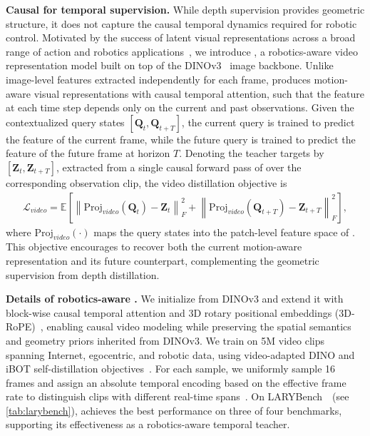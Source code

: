\noindent\textbf{Causal \dinomodel for temporal supervision.}
While depth supervision provides geometric structure, it does not capture the causal temporal dynamics required for robotic control. Motivated by the success of latent visual representations across a broad range of action and robotics applications~\cite{larybench, beingH07, lda1b, dexWorldModel, lawam, wog}, we introduce \dinomodel, a robotics-aware video representation model built on top of the DINOv3~\cite{dinov3} image backbone. Unlike image-level features extracted independently for each frame, \dinomodel produces motion-aware visual representations with causal temporal attention, such that the feature at each time step depends only on the current and past observations.
Given the contextualized query states $[\mathbf{Q}_t, \mathbf{Q}_{t+T}]$, the current query is trained to predict the \dinomodel feature of the current frame, while the future query is trained to predict the feature of the future frame at horizon $T$. Denoting the teacher targets by $[\mathbf{Z}_t, \mathbf{Z}_{t+T}]$, extracted from a single causal forward pass of \dinomodel over the corresponding observation clip, the video distillation objective is
\begin{align}
\mathcal{L}_{video}
=
\mathbb{E}\left[
\left\|\mathrm{Proj}_{video}(\mathbf{Q}_t)-\mathbf{Z}_t\right\|_F^2
+
\left\|\mathrm{Proj}_{video}(\mathbf{Q}_{t+T})-\mathbf{Z}_{t+T}\right\|_F^2
\right],
\label{eq:dino_video}
\end{align}
where $\mathrm{Proj}_{video}(\cdot)$ maps the query states into the patch-level feature space of \dinomodel. This objective encourages \method to recover both the current motion-aware representation and its future counterpart, complementing the geometric supervision from depth distillation.

\noindent\textbf{Details of robotics-aware \dinomodel.}
We initialize \dinomodel from DINOv3 and extend it with block-wise causal temporal attention and 3D rotary positional embeddings (3D-RoPE)~\cite{videorope}, enabling causal video modeling while preserving the spatial semantics and geometry priors inherited from DINOv3. 
We train \dinomodel on 5M video clips spanning Internet, egocentric, and robotic data, using video-adapted DINO and iBOT self-distillation objectives~\cite{omnistream}. 
For each sample, we uniformly sample 16 frames and assign an absolute temporal encoding based on the effective frame rate to distinguish clips with different real-time spans~\cite{cosmos3}. 
On LARYBench~\cite{larybench}~(see \cref{tab:larybench}), \dinomodel achieves the best performance on three of four benchmarks, supporting its effectiveness as a robotics-aware temporal teacher.





